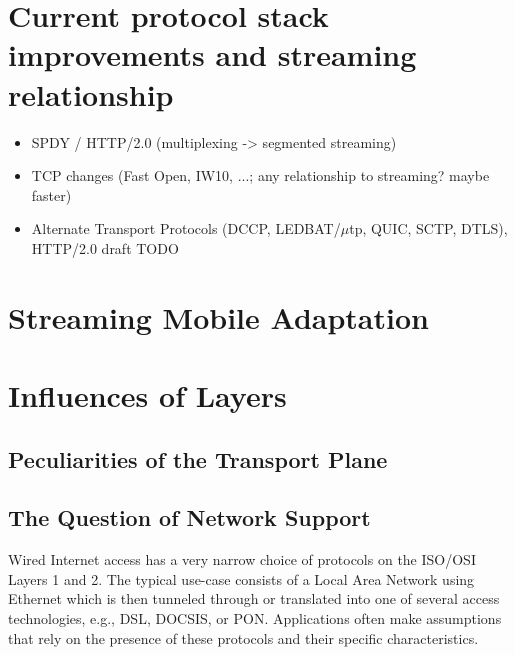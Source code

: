 \section{Current protocol stack improvements and streaming relationship}

\begin{itemize}
\item SPDY / HTTP/2.0 (multiplexing -> segmented streaming)
\item TCP changes (Fast Open, IW10, ...; any relationship to streaming? maybe faster)
\item Alternate Transport Protocols (DCCP\cite{rfc4340}, LEDBAT\cite{rfc6817}/$\mu$tp\cite{bt2010utp}, QUIC, SCTP, DTLS), HTTP/2.0 draft TODO
\end{itemize}



\section{Streaming Mobile Adaptation}



\section{Influences of Layers}
\subsection{Peculiarities of the Transport Plane}
\subsection{The Question of Network Support}




Wired Internet access has a very narrow choice of protocols on the ISO/OSI Layers 1 and 2. The typical use-case consists of a Local Area Network using Ethernet which is then tunneled through or translated into one of several access technologies, e.g., DSL, DOCSIS, or PON. Applications often make assumptions that rely on the presence of these protocols and their specific characteristics.

